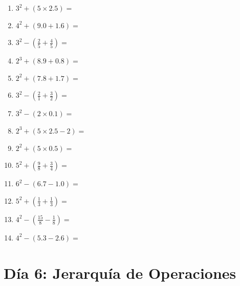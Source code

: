 \documentclass[12pt]{article}
\begin{document}
\begin{enumerate}
\item \large $ 3^{2} + (5 \times 2.5) = $ \vspace{1.4cm}
\item \large $ 4^{2} + (9.0 + 1.6) = $ \vspace{1.4cm}
\newpage
\item \large $ 3^{2} - (\frac{2}{5} + \frac{4}{5}) = $ \vspace{1.4cm}
\item \large $ 2^{3} + (8.9 + 0.8) = $ \vspace{1.4cm}
\item \large $ 2^{2} + (7.8 + 1.7) = $ \vspace{1.4cm}
\item \large $ 3^{2} - (\frac{2}{1} + \frac{3}{2}) = $ \vspace{1.4cm}
\item \large $ 3^{2} - (2 \times 0.1) = $ \vspace{1.4cm}
\item \large $ 2^{3} + (5 \times 2.5 - 2) = $ \vspace{1.4cm}
\item \large $ 2^{2} + (5 \times 0.5) = $ \vspace{1.4cm}
\item \large $ 5^{2} + (\frac{9}{8} + \frac{3}{4}) = $ \vspace{1.4cm}
\item \large $ 6^{2} - (6.7 - 1.0) = $ \vspace{1.4cm}
\item \large $ 5^{2} + (\frac{1}{3} + \frac{1}{3}) = $ \vspace{1.4cm}
\newpage
\item \large $ 4^{2} - (\frac{15}{8} - \frac{1}{8}) = $ \vspace{1.4cm}
\item \large $ 4^{2} - (5.3 - 2.6) = $ \vspace{1.4cm}
\end{enumerate}
\newpage
\section*{Día 6: Jerarquía de Operaciones}
\end{document}
